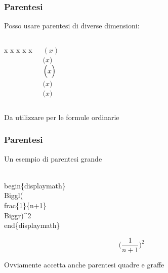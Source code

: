 \documentclass[svgnames,%
	ucs,%
	pdftex]{guitbeamer}
\begin{document}
\begin{frame}
  \frametitle{Parentesi}
	Posso usare parentesi di diverse dimensioni:
  \begin{columns}
	\begin{LaTeXcode}
		\LCmd[]{(} x \LCmd[]{)}\n
		 x \vspace{1.1ex}\n
		 x \vspace{2.2ex}\n
		 x \vspace{3ex}\n 
		 x \n
	\end{LaTeXcode}
	\begin{LaTeXoutput}
		$( x )$\\
		$\bigl( x\bigr)$\\
		$\Bigl( x \Bigr) $\\
		$\biggr( x \biggr) $\\
		$\Biggr( x \Biggr)$
	\end{LaTeXoutput}
  \end{columns}
  \bigskip
	Da utilizzare per le formule ordinarie
\end{frame}
\begin{frame}
  \frametitle{Parentesi}
	Un esempio di parentesi grande
	\begin{LaTeXcode}
		\\begin\{displaymath\}\n
		\hspace*{5ex}\alert{\\Biggl(}\\frac\{1\}\{n+1\}\alert{\\Biggr)}\textasciicircum 2\n
		\\end\{displaymath\}
	\end{LaTeXcode}
	\begin{LaTeXoutput}
		\begin{displaymath}
			\Biggl(\frac{1}{n+1}\Biggr)^2
		\end{displaymath}
	\end{LaTeXoutput}
	Ovviamente  accetta anche parentesi quadre e graffe
\end{frame}
\end{document}
